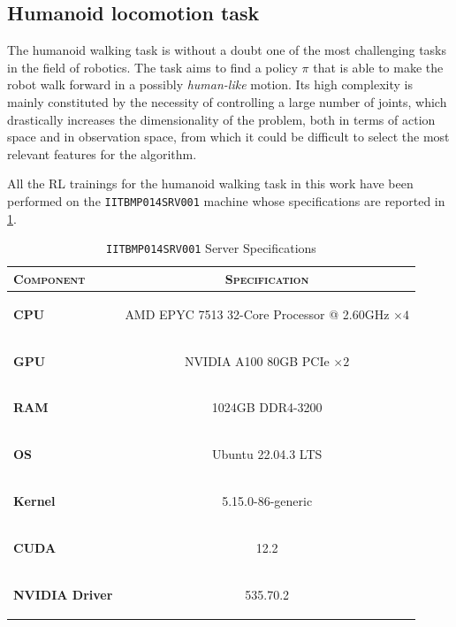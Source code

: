 \subsection{Humanoid locomotion task}
The humanoid walking task is without a doubt one of the most challenging tasks in the field of robotics. The task aims to find a policy $\pi$ that is able to make the robot walk forward in a possibly \textit{human-like} motion. Its high complexity is mainly constituted by the necessity of controlling a large number of joints, which drastically increases the dimensionality of the problem, both in terms of action space and in observation space, from which it could be difficult to select the most relevant features for the algorithm.

All the \ac{RL} trainings for the humanoid walking task in this work have been performed on the \texttt{IITBMP014SRV001} machine whose specifications are reported in \cref{tab:srv001}.

\begin{table}[h]
    \centering
    \label{tab:srv001}
    \caption{\texttt{IITBMP014SRV001} Server Specifications}
    \begin{tabular}[h]{l c}
        \toprule
        \textsc{Component}     & \textsc{Specification}                                                       \\
        \midrule
        \textbf{CPU}           & \begin{small}AMD EPYC 7513 32-Core Processor @ 2.60GHz $\times 4$\end{small} \\
        \textbf{GPU}           & \begin{small}NVIDIA A100 80GB PCIe       $\times 2$             \end{small}  \\
        \textbf{RAM}           & \begin{small}1024GB DDR4-3200                         \end{small}            \\
        \textbf{OS}            & \begin{small}Ubuntu 22.04.3 LTS                       \end{small}            \\
        \textbf{Kernel}        & \begin{small}5.15.0-86-generic                        \end{small}            \\
        \textbf{CUDA}          & \begin{small}12.2                                  \end{small}               \\
        \textbf{NVIDIA Driver} & \begin{small}535.70.2                             \end{small}                \\
        \bottomrule
    \end{tabular}
\end{table}


